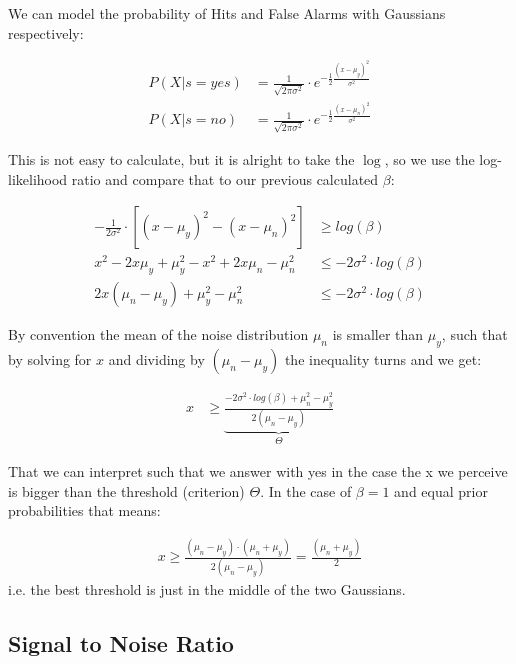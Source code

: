 \documentclass[../main/Notes.tex]{subfiles}
\begin{document}
We can model the probability of Hits and False Alarms with Gaussians respectively:

\begin{align*}
  P\left(X|s=yes\right) &= \frac{1}{\sqrt{2\pi \sigma^2}} \cdot e^{-\frac{1}{2}\frac{\left(x-\mu_y\right)^2}{\sigma^2}}\\
  P\left(X|s=no\right) &= \frac{1}{\sqrt{2\pi \sigma^2}} \cdot e^{-\frac{1}{2}\frac{\left(x-\mu_n\right)^2}{\sigma^2}}
\end{align*}

This is not easy to calculate, but it is alright to take the $\log$, so we use the log-likelihood ratio and compare that to our previous calculated $\beta$:

\begin{align*}
 -\frac{1}{2\sigma^2} \cdot \left[\left(x-\mu_y\right)^2 - \left(x-\mu_n\right)^2 \right] &\geq log\left(\beta\right)\\
  x^2 - 2x\mu_y + \mu_{y}^{2} - x^2 + 2x\mu_n - \mu_{n}^{2} &\leq -2\sigma^2 \cdot log\left(\beta\right)\\
  2x\left(\mu_n - \mu_y\right)+\mu_{y}^{2}-\mu_{n}^{2}&\leq -2\sigma^2\cdot log\left(\beta\right)\end{align*}
  
By convention the mean of the noise distribution $\mu_n$ is smaller than $\mu_y$, such that by solving for $x$ and dividing by $\left(\mu_n-\mu_y\right)$ the inequality turns and we get:

\begin{align*}
  x  &\geq \underbrace{\frac{-2\sigma^2 \cdot log\left(\beta\right) + \mu_{n}^{2}-\mu_{y}^{2}}{2\left(\mu_n-\mu_y\right)}}_{\Theta}
\end{align*}

That we can interpret such that we answer with yes in the case the x we perceive is bigger than the threshold (criterion) $\Theta$.
In the case of $\beta = 1$ and equal prior probabilities that means:

\begin{align*}
  x \geq \frac{\left(\mu_n-\mu_y\right)\cdot \left(\mu_n+\mu_y\right)}{2\left(\mu_n-\mu_y\right)} = \frac{\left(\mu_n+\mu_y\right)}{2} 
\end{align*}
i.e. the best threshold is just in the middle of the two Gaussians.

\newpage

\subsection{Signal to Noise Ratio}
\end{document}
